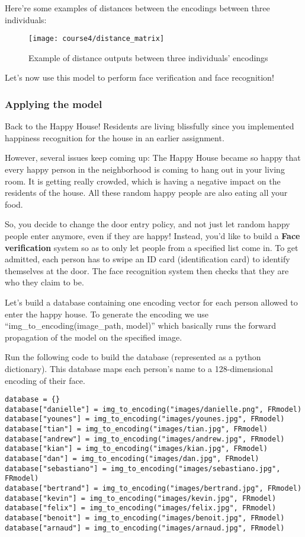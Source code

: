 Here're some examples of distances between the encodings between three individuals:
\begin{figure}[h]
\begin{center}
\texttt{[image: course4/distance\_matrix]}
\caption{Example of distance outputs between three individuals' encodings}
\end{center}
\end{figure}

Let's now use this model to perform face verification and face recognition!



\subsubsection{Applying the model}
Back to the Happy House! Residents are living blissfully since you implemented happiness recognition for the house in an earlier assignment.

However, several issues keep coming up: The Happy House became so happy that every happy person in the neighborhood is coming to hang out in your living room. It is getting really crowded, which is having a negative impact on the residents of the house. All these random happy people are also eating all your food.

So, you decide to change the door entry policy, and not just let random happy people enter anymore, even if they are happy! Instead, you'd like to build a {\textbf{Face verification}} system so as to only let people from a specified list come in. To get admitted, each person has to swipe an ID card (identification card) to identify themselves at the door. The face recognition system then checks that they are who they claim to be.



Let's build a database containing one encoding vector for each person allowed to enter the happy house. To generate the encoding we use ``img\_to\_encoding(image\_path, model)'' which basically runs the forward propagation of the model on the specified image. 

Run the following code to build the database (represented as a python dictionary). This database maps each person's name to a 128-dimensional encoding of their face.
\begin{verbatim}
database = {}
database["danielle"] = img_to_encoding("images/danielle.png", FRmodel)
database["younes"] = img_to_encoding("images/younes.jpg", FRmodel)
database["tian"] = img_to_encoding("images/tian.jpg", FRmodel)
database["andrew"] = img_to_encoding("images/andrew.jpg", FRmodel)
database["kian"] = img_to_encoding("images/kian.jpg", FRmodel)
database["dan"] = img_to_encoding("images/dan.jpg", FRmodel)
database["sebastiano"] = img_to_encoding("images/sebastiano.jpg", FRmodel)
database["bertrand"] = img_to_encoding("images/bertrand.jpg", FRmodel)
database["kevin"] = img_to_encoding("images/kevin.jpg", FRmodel)
database["felix"] = img_to_encoding("images/felix.jpg", FRmodel)
database["benoit"] = img_to_encoding("images/benoit.jpg", FRmodel)
database["arnaud"] = img_to_encoding("images/arnaud.jpg", FRmodel)
\end{verbatim}

